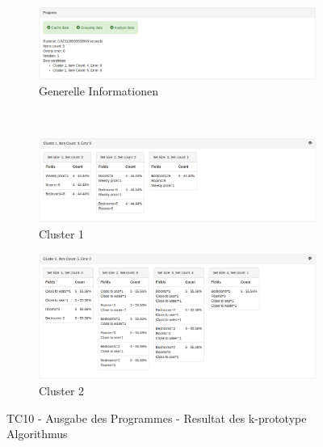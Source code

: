 \begin{figure}[H]
	\begin{subfigure}[t]{1\textwidth}
		\centering
		\includegraphics[width=1\textwidth]{images/tc10-kprototype-1}
		\caption{Generelle Informationen}
		\label{fig:testingfazit:testing:testcases:10-2-1}
	\end{subfigure} \\
	\begin{subfigure}[t]{1\textwidth}
		\centering
		\includegraphics[width=1\textwidth]{images/tc10-kprototype-2}
		\caption{Cluster 1}
		\label{fig:testingfazit:testing:testcases:10-2-2}
	\end{subfigure}
	\begin{subfigure}[t]{1\textwidth}
		\centering
		\includegraphics[width=1\textwidth]{images/tc10-kprototype-3}
		\caption{Cluster 2}
		\label{fig:testingfazit:testing:testcases:10-2-3}
	\end{subfigure}
	\caption{TC10 - Ausgabe des Programmes - Resultat des k-prototype Algorithmus}
	\label{fig:testingfazit:testing:testcases:10-2}
\end{figure}

